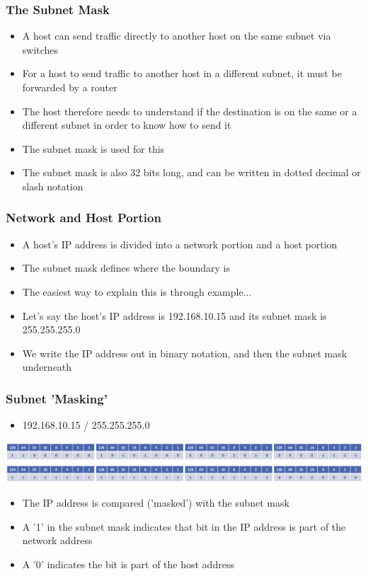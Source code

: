 \documentclass[pdflatex,compress]{beamer}
\begin{document}
\begin{frame}
	\frametitle{The Subnet Mask}
	\begin{itemize}
		\item A host can send traffic directly to another host on the same subnet via switches
		\item For a host to send traffic to another host in a different subnet, it must be forwarded by a router
		\item The host therefore needs to understand if the destination is on the same or a different subnet in order to know how to send it
		\item The subnet mask is used for this
		\item The subnet mask is also 32 bits long, and can be written in dotted decimal or slash notation
	\end{itemize}
\end{frame}

\begin{frame}
	\frametitle{Network and Host Portion}
	\begin{itemize}
		\item A host’s IP address is divided into a network portion and a host portion
		\item The subnet mask defines where the boundary is
		\item The easiest way to explain this is through example...
		\item Let’s say the host’s IP address is 192.168.10.15 and its subnet mask is 255.255.255.0
		\item We write the IP address out in binary notation, and then the subnet mask underneath
	\end{itemize}
\end{frame}

\begin{frame}
	\frametitle{Subnet 'Masking'}
	\begin{itemize}
		\item 192.168.10.15 / 255.255.255.0
	\end{itemize}
	\begin{center}
		\includegraphics[width=\linewidth]{img/img23}
	\end{center}
	\begin{itemize}
		\item The IP address is compared ('masked') with the subnet mask
		\item A '1' in the subnet mask indicates that bit in the IP address is part of the network address
		\item A '0' indicates the bit is part of the host address
	\end{itemize}
\end{frame}
\end{document}
